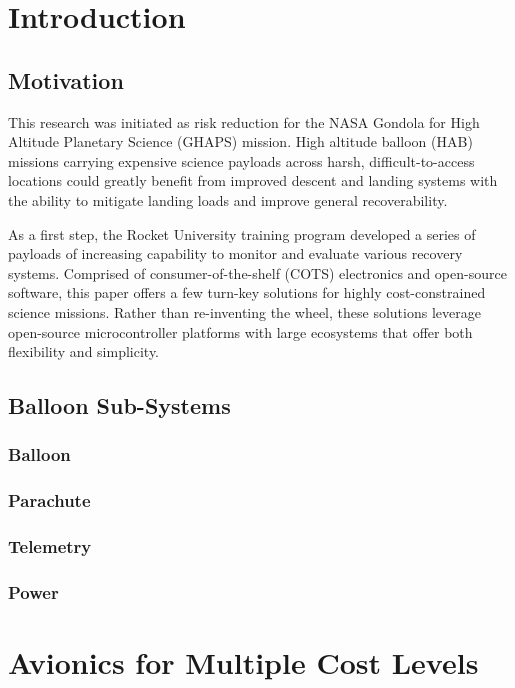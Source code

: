 \documentclass[heading.tex]{subfiles}
\begin{document}

\section{Introduction}
\subsection{Motivation}
This research was initiated as risk reduction for the NASA
Gondola for High Altitude Planetary Science (GHAPS) mission.
High altitude balloon (HAB) missions carrying expensive science payloads
across harsh, difficult-to-access locations could greatly benefit from
improved descent and landing systems with the ability to mitigate landing
loads and improve general recoverability.

As a first step, the Rocket University training program developed a series of
payloads of increasing capability to monitor and evaluate various recovery
systems. Comprised of consumer-of-the-shelf (COTS) electronics and open-source
software, this paper offers a few turn-key solutions for highly cost-constrained
science missions. Rather than re-inventing the wheel, these solutions leverage
open-source microcontroller platforms with large ecosystems that offer both
flexibility and simplicity.


\subsection{Balloon Sub-Systems}

\subsubsection{Balloon}
\subsubsection{Parachute}
\subsubsection{Telemetry}
\subsubsection{Power}

\section{Avionics for Multiple Cost Levels}
\end{document}
